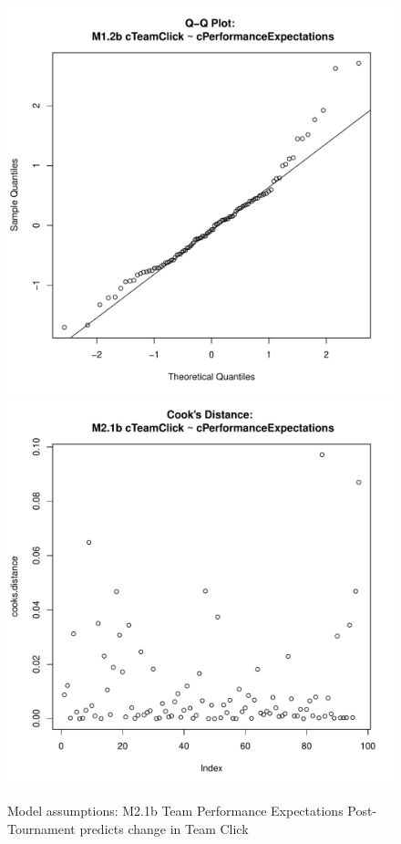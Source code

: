 {\begin{figure}[htbp]
   \includegraphics[scale =.4]{images/MLM21bQQNorm.pdf}
   \includegraphics[scale =.4]{images/MLM21bCooksD.pdf}
   \caption{Model assumptions: M2.1b Team Performance Expectations Post-Tournament predicts change in Team Click}
   \label{fig:MLM21bAssumptions}
 \end{figure}


}
